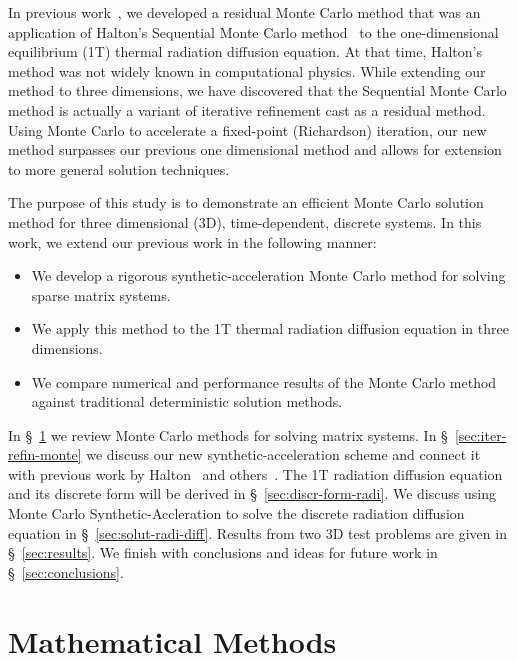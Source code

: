 \documentclass[preprint,12pt]{elsarticle}
\begin{document}
In previous work~\cite{evans_2003}, we developed a residual Monte
Carlo method that was an application of Halton's Sequential Monte
Carlo method~\cite{halton_1962,halton_1994} to the one-dimensional
equilibrium (1T) thermal radiation diffusion equation.  At that time,
Halton's method was not widely known in computational physics.  While
extending our method to three dimensions, we have discovered that the
Sequential Monte Carlo method is actually a variant of iterative
refinement cast as a residual method.  Using Monte Carlo to accelerate
a fixed-point (Richardson) iteration, our new method surpasses our
previous one dimensional method and allows for extension to more
general solution techniques.

The purpose of this study is to demonstrate an efficient Monte Carlo
solution method for three dimensional (3D), time-dependent, discrete
systems. In this work, we extend our previous work in the following
manner:

\begin{itemize}
\item We develop a rigorous synthetic-acceleration Monte Carlo method
  for solving sparse matrix systems.
\item We apply this method to the 1T thermal radiation diffusion
  equation in three dimensions.
\item We compare numerical and performance results of the Monte Carlo
  method against traditional deterministic solution methods.
\end{itemize}

In \S~\ref{sec:monte-carlo-matrix} we review Monte Carlo methods for
solving matrix systems. In \S~\ref{sec:iter-refin-monte} we discuss
our new synthetic-acceleration scheme and connect it with previous
work by Halton~\cite{halton_1994} and others~\cite{evans_2003}.  The
1T radiation diffusion equation and its discrete form will be derived
in \S~\ref{sec:discr-form-radi}.  We discuss using Monte Carlo
Synthetic-Accleration to solve the discrete radiation diffusion
equation in \S~\ref{sec:solut-radi-diff}.  Results from two 3D test
problems are given in \S~\ref{sec:results}.  We finish with
conclusions and ideas for future work in \S~\ref{sec:conclusions}.

\section{Mathematical Methods}
\label{sec:monte-carlo-matrix}
\end{document}
